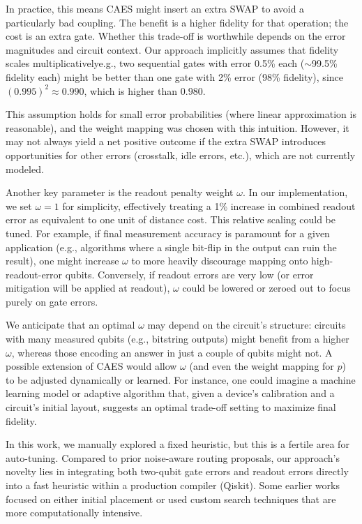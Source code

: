 \documentclass[conference]{IEEEtran}
\begin{document}
In practice, this means CAES might insert an extra SWAP to avoid a particularly bad coupling. The benefit is a higher fidelity for that operation; the cost is an extra gate. Whether this trade-off is worthwhile depends on the error magnitudes and circuit context. Our approach implicitly assumes that fidelity scales multiplicatively\textemdash e.g., two sequential gates with error 0.5\% each ($\sim$99.5\% fidelity each) might be better than one gate with 2\% error (98\% fidelity), since $(0.995)^2 \approx 0.990$, which is higher than $0.980$.

This assumption holds for small error probabilities (where linear approximation is reasonable), and the weight mapping was chosen with this intuition. However, it may not always yield a net positive outcome if the extra SWAP introduces opportunities for other errors (crosstalk, idle errors, etc.), which are not currently modeled.

Another key parameter is the readout penalty weight $\omega$. In our implementation, we set $\omega = 1$ for simplicity, effectively treating a 1\% increase in combined readout error as equivalent to one unit of distance cost. This relative scaling could be tuned. For example, if final measurement accuracy is paramount for a given application (e.g., algorithms where a single bit-flip in the output can ruin the result), one might increase $\omega$ to more heavily discourage mapping onto high-readout-error qubits. Conversely, if readout errors are very low (or error mitigation will be applied at readout), $\omega$ could be lowered or zeroed out to focus purely on gate errors.

We anticipate that an optimal $\omega$ may depend on the circuit’s structure: circuits with many measured qubits (e.g., bitstring outputs) might benefit from a higher $\omega$, whereas those encoding an answer in just a couple of qubits might not. A possible extension of CAES would allow $\omega$ (and even the weight mapping for $p$) to be adjusted dynamically or learned. For instance, one could imagine a machine learning model or adaptive algorithm that, given a device’s calibration and a circuit’s initial layout, suggests an optimal trade-off setting to maximize final fidelity.

In this work, we manually explored a fixed heuristic, but this is a fertile area for auto-tuning. Compared to prior noise-aware routing proposals, our approach’s novelty lies in integrating both two-qubit gate errors and readout errors directly into a fast heuristic within a production compiler (Qiskit). Some earlier works focused on either initial placement or used custom search techniques that are more computationally intensive.
\end{document}
